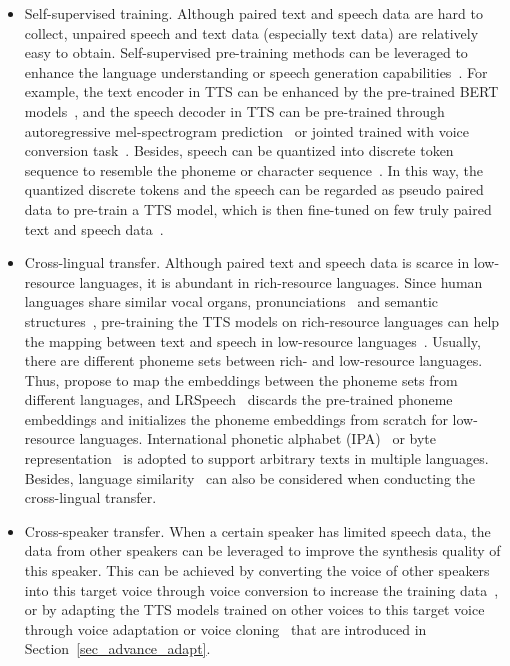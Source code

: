 \documentclass{article}
\begin{document}
\begin{itemize}[leftmargin=*]
    \item Self-supervised training. Although paired text and speech data are hard to collect, unpaired speech and text data (especially text data) are relatively easy to obtain. Self-supervised pre-training methods can be leveraged to enhance the language understanding or speech generation capabilities~\cite{chung2019semi,wang2015word,zhang2019joint,fang2019towards}. For example, the text encoder in TTS can be enhanced by the pre-trained BERT models~\cite{chung2019semi,fang2019towards,jia2021png}, and the speech decoder in TTS can be pre-trained through autoregressive mel-spectrogram prediction~\cite{chung2019semi} or jointed trained with voice conversion task~\cite{zhang2019joint}. Besides, speech can be quantized into discrete token sequence to resemble the phoneme or character sequence~\cite{tjandra2019vqvae}. In this way, the quantized discrete tokens and the speech can be regarded as pseudo paired data to pre-train a TTS model, which is then fine-tuned on few truly paired text and speech data~\cite{liu2020towards,tu2020semi,zhang2020unsupervised}.   
    \item Cross-lingual transfer. Although paired text and speech data is scarce in low-resource languages, it is abundant in rich-resource languages. Since human languages share similar vocal organs, pronunciations~\cite{wind1989evolutionary} and semantic structures~\cite{tan2019multilingual}, pre-training the TTS models on rich-resource languages can help the mapping between text and speech in low-resource languages~\cite{chen2019end,xu2020lrspeech,azizah2020hierarchical,de2020efficient,guo2018dnn,tan2019study,zhang2019deep,nekvinda2020one,yang2020towards,zhang2020uwspeech}. Usually, there are different phoneme sets between rich- and low-resource languages. Thus, \citet{chen2019end} propose to map the embeddings between the phoneme sets from different languages, and LRSpeech~\cite{xu2020lrspeech} discards the pre-trained phoneme embeddings and initializes the phoneme embeddings from scratch for low-resource languages. International phonetic alphabet (IPA)~\cite{hemati2020using} or byte representation~\cite{he2021multilingual} is adopted to support arbitrary texts in multiple languages. Besides, language similarity~\cite{tan2019multilingual} can also be considered when conducting the cross-lingual transfer.  
    \item Cross-speaker transfer. When a certain speaker has limited speech data, the data from other speakers can be leveraged to improve the synthesis quality of this speaker. This can be achieved by converting the voice of other speakers into this target voice through voice conversion to increase the training data~\cite{huybrechts2020low}, or by adapting the TTS models trained on other voices to this target voice through voice adaptation or voice cloning~\cite{chen2018sample,chen2021adaspeech} that are introduced in Section~\ref{sec_advance_adapt}. 

\end{itemize}
\end{document}
